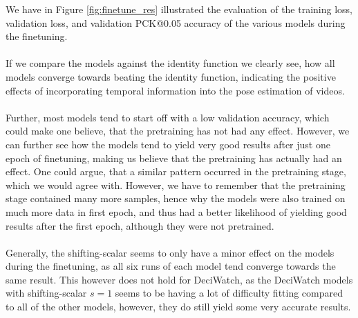 \documentclass[./main.tex]{subfiles}
\begin{document}
We have in Figure \ref{fig:finetune_res} illustrated the evaluation of the training loss, validation loss, and validation PCK@0.05 accuracy of the various models during the finetuning.
\\
\\
If we compare the models against the identity function we clearly see, how all models converge towards beating the identity function, indicating the positive effects of incorporating temporal information into the pose estimation of videos.
\\
\\
Further, most models tend to start off with a low validation accuracy, which could make one believe, that the pretraining has not had any effect. However, we can further see how the models tend to yield very good results after just one epoch of finetuning, making us believe that the pretraining has actually had an effect. One could argue, that a similar pattern occurred in the pretraining stage, which we would agree with. However, we have to remember that the pretraining stage contained many more samples, hence why the models were also trained on much more data in first epoch, and thus had a better likelihood of yielding good results after the first epoch, although they were not pretrained.
\\
\\
Generally, the shifting-scalar seems to only have a minor effect on the models during the finetuning, as all six runs of each model tend converge towards the same result. This however does not hold for DeciWatch, as the DeciWatch models with shifting-scalar $s = 1$ seems to be having a lot of difficulty fitting compared to all of the other models, however, they do still yield some very accurate results.
\end{document}
